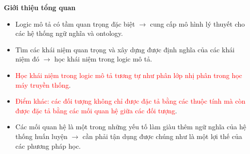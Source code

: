 \documentclass[notheorems,xcolor=dvipsnames]{beamer}
\begin{document}
\begin{frame}{\bf Giới thiệu tổng quan}
	\begin{itemize}
		\setlength{\itemsep}{2.0ex}
		\item Logic mô tả có tầm quan trọng đặc biệt $\rightarrow$ cung cấp mô hình lý thuyết cho các hệ thống ngữ nghĩa và ontology.
		
		\item Tìm các khái niệm quan trọng và xây dựng được định nghĩa của các khái niệm đó $\rightarrow$ học khái niệm trong logic mô tả.
		
		\item \textcolor{red}{Học khái niệm trong logic mô tả tương tự như phân lớp nhị phân trong học máy truyền thống}.
		
		\item \textcolor{red}{Điểm khác: các đối tượng không chỉ được đặc tả bằng các thuộc tính mà còn được đặc tả bằng các mối quan hệ giữa các đối tượng}.
		
		\item Các mối quan hệ là một trong những yếu tố làm giàu thêm ngữ nghĩa của hệ thống huấn luyện $\rightarrow$ cần phải tận dụng được chúng như là một lợi thế của các phương pháp học.
	\end{itemize}
\end{frame}
\end{document}
